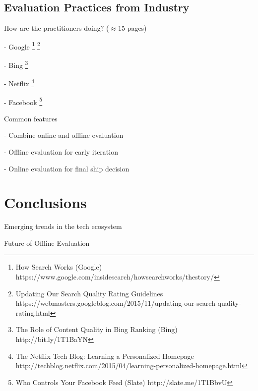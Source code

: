 \documentclass[openany]{now} %
\newcommand{\newpar}{\bigskip\noindent}
\begin{document}
\section{Evaluation Practices from Industry}

How are the practitioners doing? (\ensuremath{\approx}15 pages)

-	Google \footnote{How Search Works (Google) https://www.google.com/insidesearch/howsearchworks/thestory/} \footnote{Updating Our Search Quality Rating Guidelines
	 https://webmasters.googleblog.com/2015/11/updating-our-search-quality-rating.html}

-	Bing \footnote{The Role of Content Quality in Bing Ranking (Bing)
	 http://bit.ly/1T1BaYN}

-	Netflix \cite{Gomez-Uribe2015}  \footnote{The Netflix Tech Blog: Learning a Personalized Homepage
	http://techblog.netflix.com/2015/04/learning-personalized-homepage.html}

-	Facebook \footnote{Who Controls Your Facebook Feed (Slate) http://slate.me/1T1BbvU}

\newpar
Common features

- Combine online and offline evaluation

- Offline evaluation for early iteration

- Online evaluation for final ship decision

\chapter{Conclusions}

Emerging trends in the tech ecosystem

Future of Offline Evaluation

\backmatter  %



	
\end{document}
